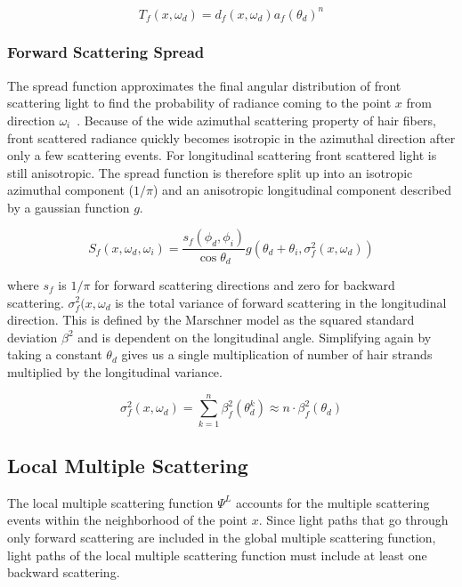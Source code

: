 \begin{equation}
T_f(x, \omega_d) = d_f(x, \omega_d) a_f(\theta_d)^n
\label{forwardscattering}
\end{equation}

\subsubsection{Forward Scattering Spread}

The spread function approximates the final angular distribution of front scattering light to find the probability of radiance coming to the point $x$ from direction $\omega_i$~\cite{zinke}. Because of the wide azimuthal scattering property of hair fibers, front scattered radiance quickly becomes isotropic in the azimuthal direction after only a few scattering events. For longitudinal scattering front scattered light is still anisotropic. The spread function is therefore split up into an isotropic azimuthal component ($1/\pi$) and an anisotropic longitudinal component described by a gaussian function $g$.

\begin{equation}
\label{dualscattering_Sf}
S_f(x, \omega_d, \omega_i) = \frac{s_f(\phi_d, \phi_i)}{\cos \theta_d} g(\theta_d + \theta_i, \sigma_f^2(x, \omega_d))
\end{equation}

where $s_f$ is $1/\pi$ for forward scattering directions and zero for backward scattering. $\sigma_f^2(x, \omega_d$ is the total variance of forward scattering in the longitudinal direction. This is defined by the Marschner model as the squared standard deviation $\beta^2$ and is dependent on the longitudinal angle. Simplifying again by taking a constant $\theta_d$ gives us a single multiplication of number of hair strands multiplied by the longitudinal variance.

\begin{equation}
\sigma_f^2(x, \omega_d) = \sum_{k=1}^{n} \beta_f^2(\theta_d^k) \approx n \cdot \beta_f^2(\theta_d)
\end{equation}


\subsection{Local Multiple Scattering}

The local multiple scattering function $\Psi^L$ accounts for the multiple scattering events within the neighborhood of the point $x$. Since light paths that go through only forward scattering are included in the global multiple scattering function, light paths of the local multiple scattering function must include at least one backward scattering.

